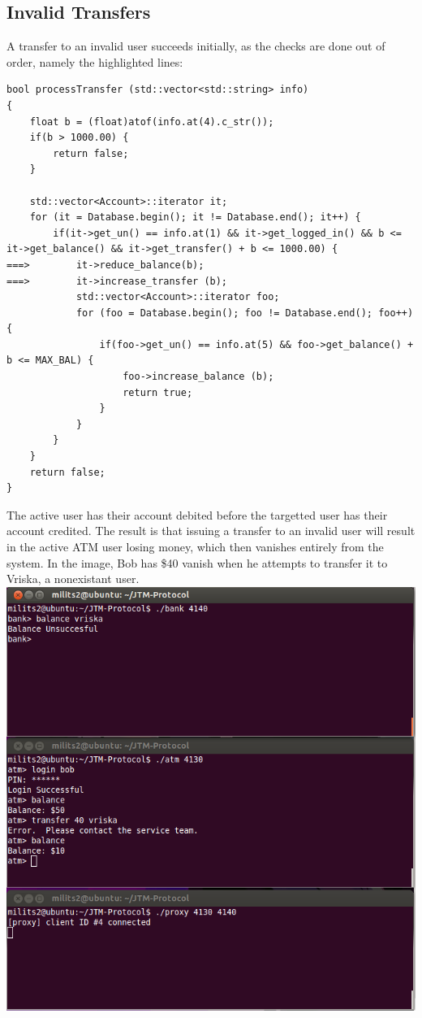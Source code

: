 \documentclass{article}
\begin{document}
\subsection{Invalid Transfers}
A transfer to an invalid user succeeds initially, as the checks are done out of order, namely the highlighted lines:
\begin{lstlisting}
bool processTransfer (std::vector<std::string> info)
{
	float b = (float)atof(info.at(4).c_str());
	if(b > 1000.00) {
		return false;
	}

	std::vector<Account>::iterator it;
	for (it = Database.begin(); it != Database.end(); it++) {
		if(it->get_un() == info.at(1) && it->get_logged_in() && b <= it->get_balance() && it->get_transfer() + b <= 1000.00) {
===>		it->reduce_balance(b);
===>		it->increase_transfer (b);
			std::vector<Account>::iterator foo;
			for (foo = Database.begin(); foo != Database.end(); foo++) {
				if(foo->get_un() == info.at(5) && foo->get_balance() + b <= MAX_BAL) {
					foo->increase_balance (b);
					return true;
				}
			}
		}
	}
	return false;
}
\end{lstlisting}
The active user has their account debited before the targetted user has their account credited. The result is that issuing a transfer to an invalid user will result in the active ATM user losing money, which then vanishes entirely from the system. In the image, Bob has \$40 vanish when he attempts to transfer it to Vriska, a nonexistant user.
\\
\includegraphics[scale=0.5]{transferLoss.png}
\\
\end{document}

